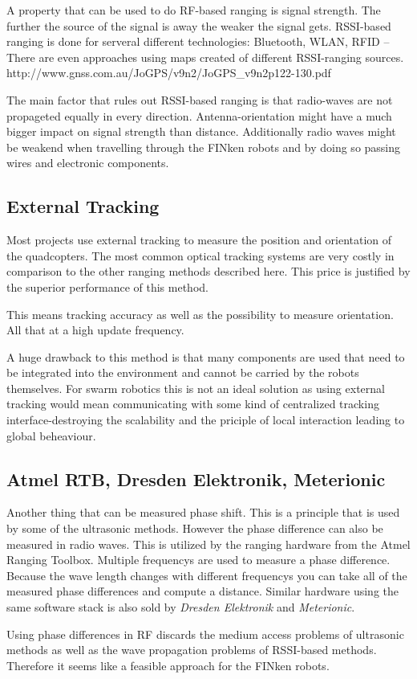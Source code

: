 A property that can be used to do RF-based ranging is signal strength.
The further the source of the signal is away the weaker the signal gets.
RSSI-based ranging is done for serveral different technologies: Bluetooth, WLAN, RFID –
There are even approaches using maps created of different RSSI-ranging sources. http://www.gnss.com.au/JoGPS/v9n2/JoGPS\_v9n2p122-130.pdf 

The main factor that rules out RSSI-based ranging is that radio-waves are not propageted equally in every direction. 
Antenna-orientation might have a much bigger impact on signal strength than distance.
Additionally radio waves might be weakend when travelling through the FINken robots and by doing so passing wires and electronic components.

\subsection{External Tracking}

Most projects use external tracking to measure the position and orientation of the quadcopters. 
The most common optical tracking systems are very costly in comparison to the other ranging methods described here.
This price is justified by the superior performance of this method.

This means tracking accuracy as well as the possibility to measure orientation.
All that at a high update frequency.


A huge drawback to this method is that many components are used that need to be integrated into the environment and cannot be carried by the robots themselves.
For swarm robotics this is not an ideal solution as using external tracking would mean communicating with some kind of centralized tracking interface-destroying the scalability and the priciple of local interaction leading to global beheaviour.
\subsection{Atmel RTB, Dresden Elektronik, Meterionic}

Another thing that can be measured phase shift.
This is a principle that is used by some of the ultrasonic methods.
However the phase difference can also be measured in radio waves.
This is utilized by the ranging hardware from the Atmel Ranging Toolbox.
Multiple frequencys are used to measure a phase difference.
Because the wave length changes with different frequencys you can take all of the measured phase differences and compute a distance.
Similar hardware using the same software stack is also sold by \emph{Dresden Elektronik} and \emph{Meterionic}.

Using phase differences in RF discards the medium access problems of ultrasonic methods as well as the wave propagation problems of RSSI-based methods.
Therefore it seems like a feasible approach for the FINken robots.


